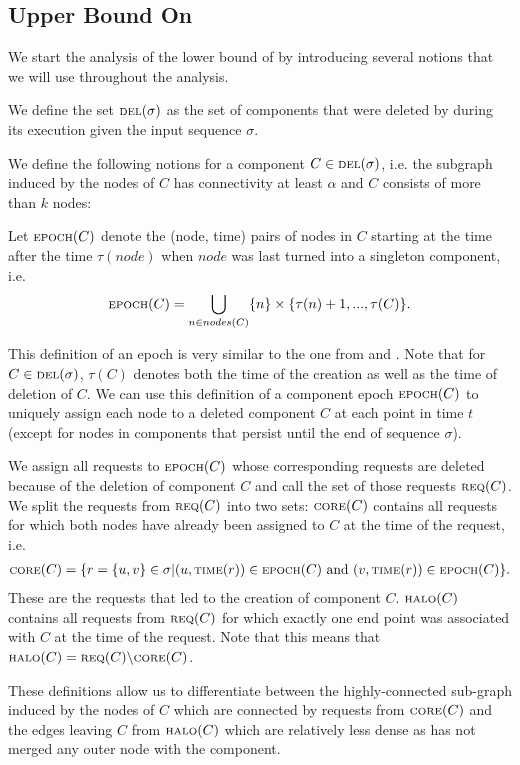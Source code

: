\documentclass[a4paper,xcolor=dvipsnames, tikz, 12pt]{article}
\newcommand{\crep}{\text{C{\scriptsize REP}}}
\newcommand{\del}{\text{\scriptsize DEL}}
\newcommand{\core}{\text{\scriptsize CORE}}
\newcommand{\halo}{\text{\scriptsize HALO}}
\newcommand{\req}{\text{\scriptsize REQ}}
\newcommand{\epoch}{\text{\scriptsize EPOCH}}
\newcommand{\reqTime}{\text{\scriptsize TIME}}
\theoremstyle{definition}
\begin{document}
\subsection{Upper Bound On \crep{}}

We start the analysis of the lower bound of \crep{} by introducing several notions that we will use throughout the analysis.

We define the set $\del(\sigma)$ as the set of components that were deleted by \crep{} during its execution given the input sequence $\sigma$.

We define the following notions for a component $C\in\del{}(\sigma)$, i.e. the subgraph induced by the nodes of $C$ has connectivity at least $\alpha$ and $C$ consists of more than $k$ nodes:

Let $\epoch{}(C)$ denote the (node, time) pairs of nodes in $C$ starting at the time after the time $\tau(node)$ when $node$ was last turned into a singleton component, i.e. 
\begin{align*}
	\epoch{}(C)=\bigcup_{n\in nodes(C)}\{n\}\times\{\tau(n)+1,...,\tau(C)\}.
\end{align*}

This definition of an epoch is very similar to the one from \cite{Avin2016} and \cite{Avin2015}.
Note that for $C\in\del(\sigma)$, $\tau(C)$ denotes both the time of the creation as well as the time of deletion of $C$. We can use this definition of a component epoch $\epoch(C)$ to uniquely assign each node to a deleted component $C$ at each point in time $t$ (except for nodes in components that persist until the end of sequence $\sigma$).

We assign all requests to $\epoch(C)$ whose corresponding requests are deleted because of the deletion of component $C$ and call the set of those requests $\req(C)$.
We split the requests from $\req{}(C)$ into two sets: $\core(C)$ contains all requests for which both nodes have already been assigned to $C$ at the time of the request, i.e. 
\begin{align*}
\core(C)=\{r=\{u,v\}\in\sigma| (u,\reqTime(r))\in \epoch(C)\text{ and } (v, \reqTime(r))\in \epoch(C)\}.
\end{align*}
These are the requests that led to the creation of component $C$. 
$\halo(C)$ contains all requests from $\req(C)$ for which exactly one end point was associated with $C$ at the time of the request. Note that this means that $\halo(C)=\req(C)\backslash \core(C)$.

These definitions allow us to differentiate between the highly-connected sub-graph induced by the nodes of $C$ which are connected by requests from $\core(C)$ and the edges leaving $C$ from $\halo(C)$ which are relatively less dense as \crep{} has not merged any outer node with the component.
\end{document}
